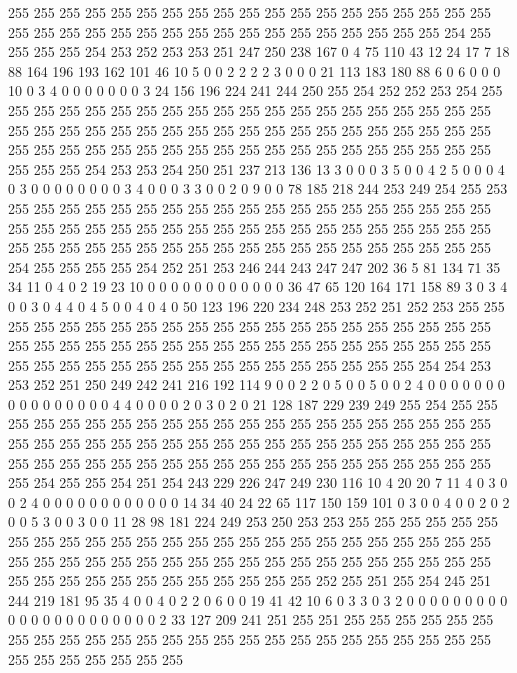 255 255 255 255 255 255 255 255 255 255 255 255 255 255 255 255 255 255 255 255
255 255 255 255 255 255 255 255 255 255 255 255 255 255 255 255 254 255 255 255
255 254 253 252 253 253 251 247 250 238 167 0 4 75 110 43 12 24 17 7
18 88 164 196 193 162 101 46 10 5 0 0 2 2 2 2 3 0 0 0
21 113 183 180 88 6 0 6 0 0 0 10 0 3 4 0 0 0 0 0
0 0 3 24 156 196 224 241 244 250 255 254 252 252 253 254 255 255 255 255
255 255 255 255 255 255 255 255 255 255 255 255 255 255 255 255 255 255 255 255
255 255 255 255 255 255 255 255 255 255 255 255 255 255 255 255 255 255 255 255
255 255 255 255 255 255 255 255 255 255 255 255 255 255 255 255 255 254 253 253
254 250 251 237 213 136 13 3 0 0 0 3 5 0 0 4 2 5 0 0
0 4 0 3 0 0 0 0 0 0 0 0 3 4 0 0 0 3 3 0
0 2 0 9 0 0 78 185 218 244 253 249 254 255 253 255 255 255 255 255
255 255 255 255 255 255 255 255 255 255 255 255 255 255 255 255 255 255 255 255
255 255 255 255 255 255 255 255 255 255 255 255 255 255 255 255 255 255 255 255
255 255 255 255 255 255 255 255 255 255 255 255 254 255 255 255 255 254 252 251
253 246 244 243 247 247 202 36 5 81 134 71 35 34 11 0 4 0 2 19
23 10 0 0 0 0 0 0 0 0 0 0 0 0 36 47 65 120 164 171
158 89 3 0 3 4 0 0 3 0 4 4 0 4 5 0 0 4 0 4
0 50 123 196 220 234 248 253 252 251 252 253 255 255 255 255 255 255 255 255
255 255 255 255 255 255 255 255 255 255 255 255 255 255 255 255 255 255 255 255
255 255 255 255 255 255 255 255 255 255 255 255 255 255 255 255 255 255 255 255
255 255 255 255 255 255 255 255 254 254 253 253 252 251 250 249 242 241 216 192
114 9 0 0 2 2 0 5 0 0 5 0 0 2 4 0 0 0 0 0
0 0 0 0 0 0 0 0 0 0 0 4 4 0 0 0 0 2 0 3
0 2 0 21 128 187 229 239 249 255 254 255 255 255 255 255 255 255 255 255
255 255 255 255 255 255 255 255 255 255 255 255 255 255 255 255 255 255 255 255
255 255 255 255 255 255 255 255 255 255 255 255 255 255 255 255 255 255 255 255
255 255 255 255 255 255 255 255 255 255 255 254 255 255 254 251 254 243 229 226
247 249 230 116 10 4 20 20 7 11 4 0 3 0 0 2 4 0 0 0
0 0 0 0 0 0 0 0 0 14 34 40 24 22 65 117 150 159 101 0
3 0 0 4 0 0 2 0 2 0 0 5 3 0 0 3 0 0 11 28
98 181 224 249 253 250 253 253 255 255 255 255 255 255 255 255 255 255 255 255
255 255 255 255 255 255 255 255 255 255 255 255 255 255 255 255 255 255 255 255
255 255 255 255 255 255 255 255 255 255 255 255 255 255 255 255 255 255 255 255
255 255 255 255 252 255 251 255 254 245 251 244 219 181 95 35 4 0 0 4
0 2 2 0 6 0 0 19 41 42 10 6 0 3 3 0 3 2 0 0
0 0 0 0 0 0 0 0 0 0 0 0 0 0 0 0 0 0 0 0
2 33 127 209 241 251 255 251 255 255 255 255 255 255 255 255 255 255 255 255
255 255 255 255 255 255 255 255 255 255 255 255 255 255 255 255 255 255 255 255
